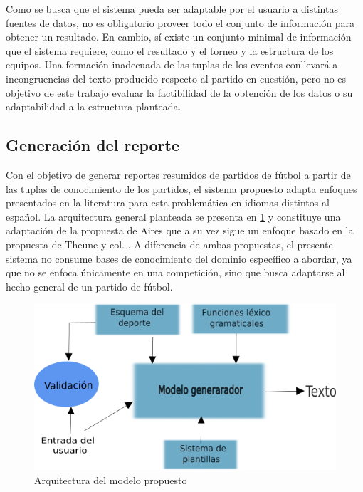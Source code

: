     Como se busca que el sistema pueda ser adaptable por el usuario a distintas fuentes de datos, no es obligatorio proveer todo el conjunto de información para 
obtener un resultado. En cambio, sí existe un conjunto minimal de información que el sistema requiere, como el resultado y el torneo y la estructura de los equipos. 
Una formación inadecuada de las tuplas de los eventos conllevará a incongruencias del texto producido respecto al partido en cuestión, pero no es objetivo de 
este trabajo evaluar la factibilidad de la obtención de los datos o su adaptabilidad a la estructura planteada.


\subsection{Generación del reporte}

    Con el objetivo de generar reportes resumidos de partidos de fútbol a partir de las tuplas de conocimiento de los partidos, el sistema propuesto adapta enfoques presentados 
en la literatura para esta problemática en idiomas distintos al español. La arquitectura general planteada se presenta en \ref{arquitecturadelmodelo} y constituye una 
adaptación de la propuesta de Aires  que a su vez sigue un enfoque basado en la propuesta de Theune y col. . A diferencia de ambas propuestas, el 
presente sistema no consume bases de conocimiento del dominio específico a abordar, ya que no se enfoca únicamente en una competición, sino que busca adaptarse al hecho 
general de un partido de fútbol. 


\begin{figure}[!]
    \begin{center}
        \includegraphics[scale=0.9]{Graphics/arquitecturaprop2.png}
    \end{center}
    \caption{Arquitectura del modelo propuesto}
    \label{arquitecturadelmodelo}
\end{figure}

